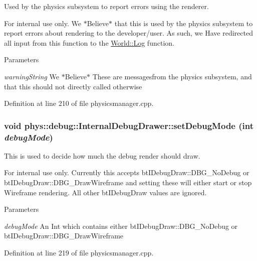 Used by the physics subsystem to report errors using the renderer. 

\begin{DoxyInternal}{For internal use only.}
We $\ast$Believe$\ast$ that this is used by the physics subsystem to report errors about rendering to the developer/user. As such, we Have redirected all input from this function to the \hyperlink{classphys_1_1World_a115b287bc8a23dfdf314f715a818e293}{World::Log} function. 
\begin{DoxyParams}{Parameters}
\item[{\em warningString}]We $\ast$Believe$\ast$ These are messagesfrom the physics subsystem, and that this should not directly called otherwise \end{DoxyParams}
\end{DoxyInternal}


Definition at line 210 of file physicsmanager.cpp.

\hypertarget{classphys_1_1debug_1_1InternalDebugDrawer_a63059b273ed6031a393b2d994b820bcc}{
\subsubsection[{setDebugMode}]{\setlength{\rightskip}{0pt plus 5cm}void phys::debug::InternalDebugDrawer::setDebugMode (int {\em debugMode})}}
\label{db/d27/classphys_1_1debug_1_1InternalDebugDrawer_a63059b273ed6031a393b2d994b820bcc}


This is used to decide how much the debug render should draw. 

\begin{DoxyInternal}{For internal use only.}
Currently this accepts btIDebugDraw::DBG\_\-NoDebug or btIDebugDraw::DBG\_\-DrawWireframe and setting these will either start or stop Wireframe rendering. All other btIDebugDraw values are ignored. 
\begin{DoxyParams}{Parameters}
\item[{\em debugMode}]An Int which contains either btIDebugDraw::DBG\_\-NoDebug or btIDebugDraw::DBG\_\-DrawWireframe \end{DoxyParams}
\end{DoxyInternal}


Definition at line 219 of file physicsmanager.cpp.


